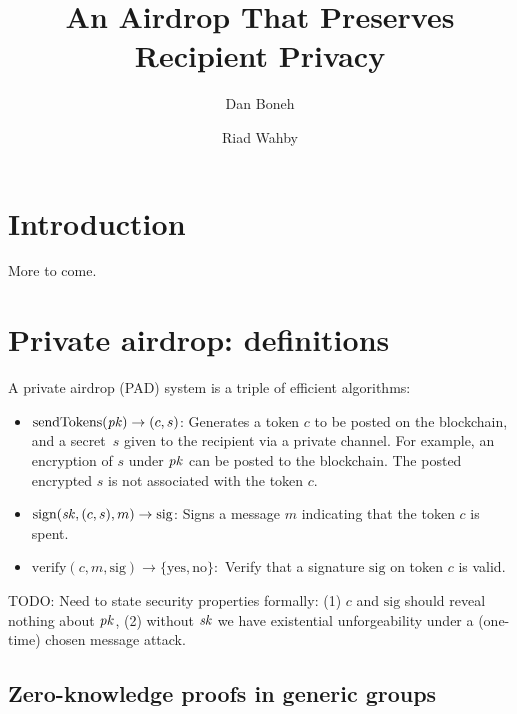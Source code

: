 \documentclass[11pt]{article}
\begin{document}
\title{An Airdrop That Preserves Recipient Privacy}
\author{Dan Boneh \and Riad Wahby}

\maketitle

\begin{abstract}
\end{abstract}

\section{Introduction}

More to come.


\section{Private airdrop: definitions}


A private airdrop (PAD) system is a triple of efficient algorithms:
\begin{itemize}
\item $\text{sendTokens}(\mathit{pk}) \to (c, s)$:
Generates a token $c$ to be posted on the blockchain,
and a secret~$s$ given to the recipient via a private channel.
For example, an encryption of $s$ under $\mathit{pk}$ can be posted
to the blockchain.   The posted encrypted $s$ is not associated with 
the token $c$. 

\item $\text{sign}(\mathit{sk}, (c, s), m) \to \text{sig}$:
Signs a message $m$ indicating that the token $c$ is spent.

\item $\text{verify}(c, m, \text{sig}) \to \{\text{yes},\text{no}\}:$
Verify that a signature $\text{sig}$ on token $c$ is valid.
\end{itemize}

TODO: Need to state security properties formally: 
(1) $c$ and $\text{sig}$ should reveal nothing about $\mathit{pk}$,
(2) without $\mathit{sk}$ we have existential unforgeability under a 
(one-time) chosen message attack.


\subsection{Zero-knowledge proofs in generic groups}
\end{document}
